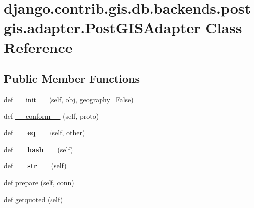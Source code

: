 \hypertarget{classdjango_1_1contrib_1_1gis_1_1db_1_1backends_1_1postgis_1_1adapter_1_1_post_g_i_s_adapter}{}\section{django.\+contrib.\+gis.\+db.\+backends.\+postgis.\+adapter.\+Post\+G\+I\+S\+Adapter Class Reference}
\label{classdjango_1_1contrib_1_1gis_1_1db_1_1backends_1_1postgis_1_1adapter_1_1_post_g_i_s_adapter}
\subsection*{Public Member Functions}
\begin{DoxyCompactItemize}
\item 
def \mbox{\hyperlink{classdjango_1_1contrib_1_1gis_1_1db_1_1backends_1_1postgis_1_1adapter_1_1_post_g_i_s_adapter_aead85f45057c56974b9eaaeccb43f277}{\+\_\+\+\_\+init\+\_\+\+\_\+}} (self, obj, geography=False)
\item 
def \mbox{\hyperlink{classdjango_1_1contrib_1_1gis_1_1db_1_1backends_1_1postgis_1_1adapter_1_1_post_g_i_s_adapter_aa84dcdaf83bdce24b1a025639ed342f4}{\+\_\+\+\_\+conform\+\_\+\+\_\+}} (self, proto)
\item 
\mbox{\label{classdjango_1_1contrib_1_1gis_1_1db_1_1backends_1_1postgis_1_1adapter_1_1_post_g_i_s_adapter_a1372a8efdcba9ebe2d082f42fffa5b23}} 
def {\bfseries \+\_\+\+\_\+eq\+\_\+\+\_\+} (self, other)
\item 
\mbox{\label{classdjango_1_1contrib_1_1gis_1_1db_1_1backends_1_1postgis_1_1adapter_1_1_post_g_i_s_adapter_a14a1b0ca37531e86c3c9bca0c3ecd1ac}} 
def {\bfseries \+\_\+\+\_\+hash\+\_\+\+\_\+} (self)
\item 
\mbox{\label{classdjango_1_1contrib_1_1gis_1_1db_1_1backends_1_1postgis_1_1adapter_1_1_post_g_i_s_adapter_a02b657bf66893e3be5fc18ae3ee9b31a}} 
def {\bfseries \+\_\+\+\_\+str\+\_\+\+\_\+} (self)
\item 
def \mbox{\hyperlink{classdjango_1_1contrib_1_1gis_1_1db_1_1backends_1_1postgis_1_1adapter_1_1_post_g_i_s_adapter_a3d40d85fca7717038e4ddcd281e63627}{prepare}} (self, conn)
\item 
def \mbox{\hyperlink{classdjango_1_1contrib_1_1gis_1_1db_1_1backends_1_1postgis_1_1adapter_1_1_post_g_i_s_adapter_a784b32c3ccda26c838e76a62c6549663}{getquoted}} (self)
\end{DoxyCompactItemize}
